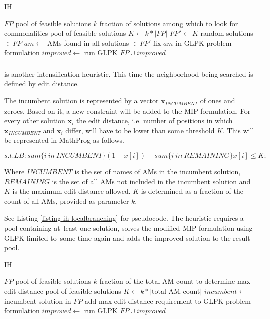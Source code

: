 \begin{algorithm}
\caption{ IH}
\label{listing-ih-crossover}
\begin{algorithmic}
\REQUIRE $FP$ pool of feasible solutions
\REQUIRE $k$ fraction of solutions among which to look for commonalities
\ENSURE pool of feasible solutions
\STATE $K \gets k * |FP|$
\STATE $FP' \gets K$ random solutions $\in FP$
\STATE $am \gets$ AMs found in all solutions $\in FP'$
\STATE fix $am$ in GLPK problem formulation
\STATE $improved \gets $ run GLPK
\RETURN $FP \cup improved$
\end{algorithmic}
\end{algorithm}

\subsubsection{}

 is another intensification heuristic. This time the neighborhood being searched is defined by edit distance.

The incumbent solution is represented by a vector $\mathbf{x}_{INCUMBENT}$ of ones and zeroes. Based on it, a new constraint will be added to the MIP formulation. For every other solution $\mathbf{x}_i$ the edit distance, i.e. number of positions in which $\mathbf{x}_{INCUMBENT}$ and $\mathbf{x}_i$ differ, will have to be lower than some threshold $K$. This will be represented in MathProg as follows.

\[s.t. LB: sum\{i\ in\ INCUMBENT\} (1 - x[i]) + sum\{i\ in\ REMAINING\} x[i] \leq K;\]

Where $INCUMBENT$ is the set of names of AMs in the incumbent solution, $REMAINING$ is the set of all AMs not included in the incumbent solution and $K$ is the maximum edit distance allowed. $K$ is determined as a fraction of the count of all AMs, provided as parameter $k$.

See Listing \ref{listing-ih-localbranching} for pseudocode. The heuristic requires a pool containing at~least one solution, solves the modified MIP formulation using GLPK limited to~some time again and adds the improved solution to the result pool.\\

\begin{algorithm}
\caption{ IH}
\label{listing-ih-localbranching}
\begin{algorithmic}
\REQUIRE $FP$ pool of feasible solutions
\REQUIRE $k$ fraction of the total AM count to determine max edit distance
\ENSURE pool of feasible solutions
\STATE $K \gets k * |$total AM count$|$
\STATE $incumbent \gets $ incumbent solution in $FP$
\STATE add max edit distance requirement to GLPK problem formulation
\STATE $improved \gets $ run GLPK
\RETURN $FP \cup improved$
\end{algorithmic}
\end{algorithm}

